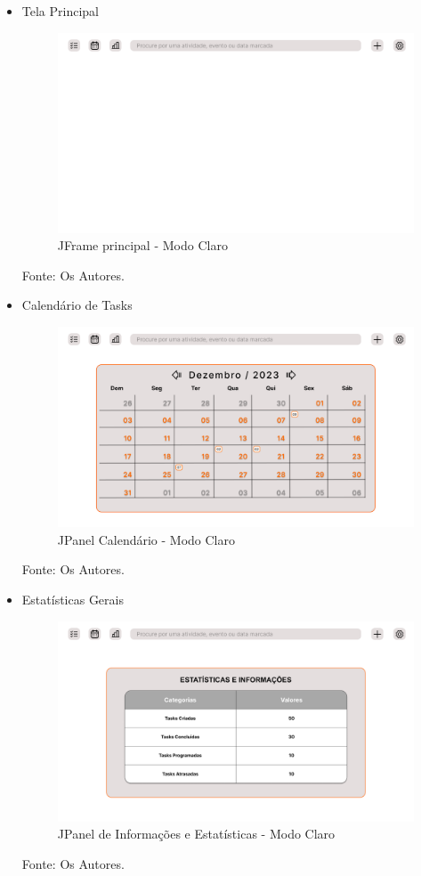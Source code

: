 \documentclass[a4paper,12pt]{article}
\begin{document}
\begin{itemize}
	\item Tela Principal
	\begin{figure}[H]
		\centering
		\includegraphics[scale=0.19]{prototypes/white/Main Window.png}
		\caption{JFrame principal - Modo Claro}
	\end{figure}
	\noindent Fonte: Os Autores.

	\item Calendário de Tasks
	\begin{figure}[H]
		\centering
		\includegraphics[scale=0.19]{prototypes/white/Calendar Panel Window.png}
		\caption{JPanel Calendário - Modo Claro}
	\end{figure}	
	\noindent Fonte: Os Autores.

	\pagebreak
	\item Estatísticas Gerais
	\begin{figure}[H]
		\centering
		\includegraphics[scale=0.19]{prototypes/white/Stats Panel Window.png}
		\caption{JPanel de Informações e Estatísticas - Modo Claro}
	\end{figure}
	\noindent Fonte: Os Autores.


\end{itemize}
\end{document}
